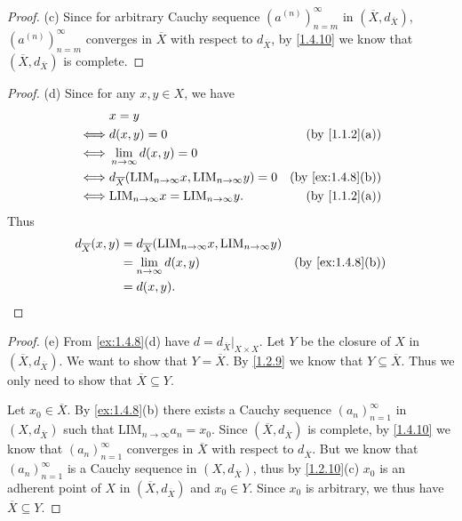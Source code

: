 \begin{proof}{(c)}
  Since for arbitrary Cauchy sequence \((a^{(n)})_{n = m}^\infty\) in \((\overline{X}, d_{\overline{X}})\), \((a^{(n)})_{n = m}^\infty\) converges in \(\overline{X}\) with respect to \(d_{\overline{X}}\), by \cref{1.4.10} we know that \((\overline{X}, d_{\overline{X}})\) is complete.
\end{proof}

\begin{proof}{(d)}
  Since for any \(x, y \in X\), we have
  \begin{align*}
         & x = y                                                                                                           \\
    \iff & d(x, y) = 0                                                                    & \text{(by \cref{1.1.2}(a))}    \\
    \iff & \lim_{n \to \infty} d(x, y) = 0                                                                                 \\
    \iff & d_{\overline{X}}(\text{LIM}_{n \to \infty} x, \text{LIM}_{n \to \infty} y) = 0 & \text{(by \cref{ex:1.4.8}(b))} \\
    \iff & \text{LIM}_{n \to \infty} x = \text{LIM}_{n \to \infty} y.                     & \text{(by \cref{1.1.2}(a))}
  \end{align*}
  Thus
  \begin{align*}
    d_{\overline{X}}(x, y) & = d_{\overline{X}}(\text{LIM}_{n \to \infty} x, \text{LIM}_{n \to \infty} y)                                  \\
                           & = \lim_{n \to \infty} d(x, y)                                                & \text{(by \cref{ex:1.4.8}(b))} \\
                           & = d(x, y).
  \end{align*}
\end{proof}

\begin{proof}{(e)}
  From \cref{ex:1.4.8}(d) have \(d = d_{\overline{X}}|_{X \times X}\).
  Let \(Y\) be the closure of \(X\) in \((\overline{X}, d_{\overline{X}})\).
  We want to show that \(Y = \overline{X}\).
  By \cref{1.2.9} we know that \(Y \subseteq \overline{X}\).
  Thus we only need to show that \(\overline{X} \subseteq Y\).

  Let \(x_0 \in \overline{X}\).
  By \cref{ex:1.4.8}(b) there exists a Cauchy sequence \((a_n)_{n = 1}^\infty\) in \((X, d_{\overline{X}})\) such that \(\text{LIM}_{n \to \infty} a_n = x_0\).
  Since \((\overline{X}, d_{\overline{X}})\) is complete, by \cref{1.4.10} we know that \((a_n)_{n = 1}^\infty\) converges in \(\overline{X}\) with respect to \(d_{\overline{X}}\).
  But we know that \((a_n)_{n = 1}^\infty\) is a Cauchy sequence in \((X, d_{\overline{X}})\), thus by \cref{1.2.10}(c) \(x_0\) is an adherent point of \(X\) in \((\overline{X}, d_{\overline{X}})\) and \(x_0 \in Y\).
  Since \(x_0\) is arbitrary, we thus have \(\overline{X} \subseteq Y\).
\end{proof}

